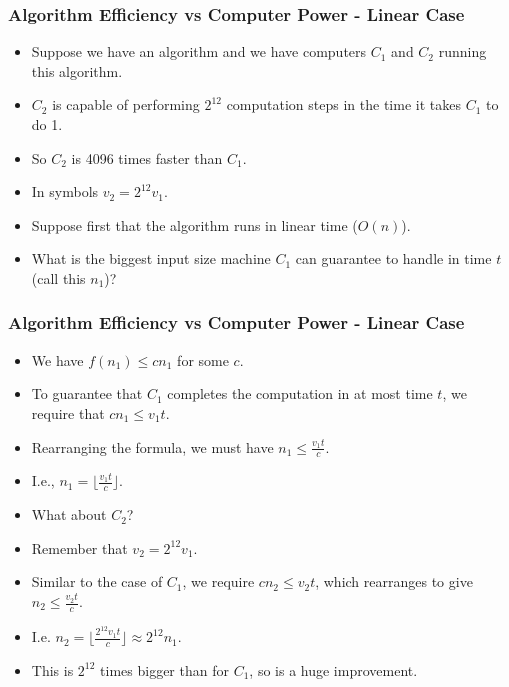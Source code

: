 \documentclass[handout]{beamer}
\begin{document}
\begin{frame}
\frametitle{Algorithm Efficiency vs Computer Power - Linear Case}
\begin{itemize}
\item Suppose we have an algorithm and we have computers $C_1$ and $C_2$ running this algorithm. 
\vspace{0.3cm}
\item $C_2$ is capable of performing $2^{12}$ computation steps in the time it takes $C_1$ to do 1.
\vspace{0.3cm}
\item So $C_2$ is 4096 times faster than $C_1$. 
\vspace{0.3cm}
\item In symbols $v_2 = 2^{12}v_1$. 
\vspace{0.3cm}
\item Suppose first that the algorithm runs in linear time ($O(n)$). 
\vspace{0.3cm}
\item What is the biggest input size machine $C_1$ can guarantee to handle in time $t$ (call this $n_1$)? 
\end{itemize}
\end{frame}

\begin{frame}
\frametitle{Algorithm Efficiency vs Computer Power - Linear Case}
\begin{itemize}
\item We have $f(n_1)\leq cn_1$ for some $c$.
\vspace{0.2cm} 
\item To guarantee that $C_1$ completes the computation in at most time $t$, we require that $cn_1\leq v_1t$.
\vspace{0.2cm} 
\item Rearranging the formula, we must have $n_1\leq \frac{v_1t}{c}$. 
\vspace{0.2cm} 
\item I.e., $n_1 =\lfloor \frac{v_1t}{c}\rfloor$. 
\vspace{0.2cm} 
\item What about $C_2$? 
\vspace{0.2cm} 
\item Remember that $v_2 = 2^{12}v_1$. 
\vspace{0.2cm} 
\item Similar to the case of $C_1$, we require $cn_2\leq v_2 t$, which rearranges to give $n_2\leq \frac{v_2t}{c}$. 
\vspace{0.2cm} 
\item I.e. $n_2=\lfloor \frac{2^{12}v_1t}{c}\rfloor \approx 2^{12}n_1$. 
\vspace{0.2cm} 
\item This is $2^{12}$ times bigger than for $C_1$, so is a huge improvement.
\end{itemize}
\end{frame}
\end{document}
